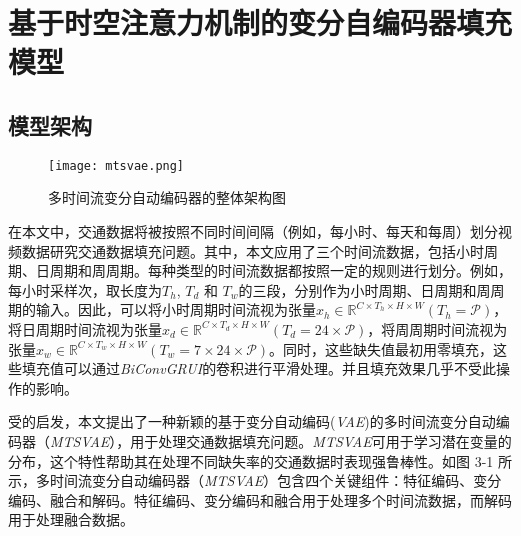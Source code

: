 \section{基于时空注意力机制的变分自编码器填充模型} \label{sec3_3}

\subsection{模型架构}
\begin{figure*}[b]
\vspace{-0.2cm} 
\centerline{\texttt{[image: mtsvae.png]}}
\caption{多时间流变分自动编码器的整体架构图 \label{MTSVAE}}
\label{fig}
\vspace{-0.2cm} 
\end{figure*}

在本文中，交通数据将被按照不同时间间隔（例如，每小时、每天和每周）划分视频数据研究交通数据填充问题。其中，本文应用了三个时间流数据，包括小时周期、日周期和周周期。每种类型的时间流数据都按照一定的规则进行划分。例如，每小时采样次，取长度为$T_h$, $T_d$ 和 $T_w$的三段，分别作为小时周期、日周期和周周期的输入。因此，可以将小时周期时间流视为张量$x_h \in \mathbb{R}^{C\times T_h\times H\times W}(T_h = \mathcal{P})$，将日周期时间流视为张量$x_d \in \mathbb{R}^{C\times T_d\times H\times W}(T_d = 24\times \mathcal{P})$，将周周期时间流视为张量$x_w \in \mathbb{R}^{C\times T_w\times H\times W}(T_w = 7\times24\times \mathcal{P})$。同时，这些缺失值最初用零填充，这些填充值可以通过\textit{BiConvGRUI}的卷积进行平滑处理。并且填充效果几乎不受此操作的影响\cite{17}。

受\cite{1}的启发，本文提出了一种新颖的基于变分自动编码(\textit{VAE})的多时间流变分自动编码器（\textit{MTSVAE}），用于处理交通数据填充问题。\textit{MTSVAE}可用于学习潜在变量的分布，这个特性帮助其在处理不同缺失率的交通数据时表现强鲁棒性。如图 3-1 所示，多时间流变分自动编码器（\textit{MTSVAE}）包含四个关键组件：特征编码、变分编码、融合和解码。特征编码、变分编码和融合用于处理多个时间流数据，而解码用于处理融合数据。

